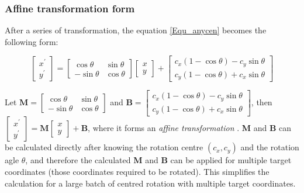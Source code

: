 \subsubsection{Affine transformation form}
After a series of transformation, the equation \ref{Equ_anycen} becomes the following form:

\begin{equation} \label{Equ_aff}
  \begin{bmatrix}
   x^{'} \\ y^{'}
   \end{bmatrix}  = \begin{bmatrix} \cos\theta & \sin\theta \\ -\sin\theta & \cos\theta \end{bmatrix} \begin{bmatrix} x \\ y \end{bmatrix}
+ \begin{bmatrix} c_{x}(1 - \cos\theta) - c_{y}\sin\theta \\ c_{y}(1 - \cos\theta) + c_{x}\sin\theta \end{bmatrix}
\end{equation}

\par\noindent
Let $ \textbf{M} = \begin{bmatrix} \cos\theta & \sin\theta \\ -\sin\theta & \cos\theta \end{bmatrix} $
and $ \textbf{B} = \begin{bmatrix} c_{x}(1 - \cos\theta) - c_{y}\sin\theta \\ c_{y}(1 - \cos\theta) + c_{x}\sin\theta \end{bmatrix}$, then $ \begin{bmatrix} x^{'} \\ y^{'} \end{bmatrix}  = \textbf{M} \begin{bmatrix} x \\ y \end{bmatrix} + \textbf{B}$,
where it forms an \textit{affine transformation} \cite{WolframAT}. \textbf{M} and \textbf{B} can be calculated directly after knowing the rotation centre $(c_{x}, c_{y})$ and the
rotation agle $\theta$, and therefore the calculated \textbf{M} and  \textbf{B} can be applied for multiple target coordinates (those coordinates required to be rotated). This simplifies the calculation for a large batch of centred rotation with multiple target coordinates.



